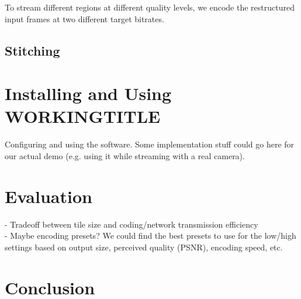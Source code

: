 To stream different regions at different quality levels, we encode the restructured input frames at two different target bitrates.

\subsection{Stitching}

\section{Installing and Using WORKINGTITLE}
Configuring and using the software. Some implementation stuff could go here for our actual demo (e.g. using it while streaming with a real camera).

\section{Evaluation}
- Tradeoff between tile size and coding/network transmission efficiency \\
- Maybe encoding presets? We could find the best presets to use for the low/high settings based on output size, perceived quality (PSNR), encoding speed, etc.

\section{Conclusion}